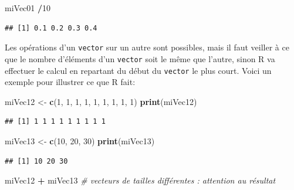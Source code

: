 \documentclass[
]{book}
\newenvironment{Shaded}{\begin{snugshade}}{\end{snugshade}}
\newcommand{\CommentTok}[1]{\textcolor[rgb]{0.56,0.35,0.01}{\textit{#1}}}
\newcommand{\DecValTok}[1]{\textcolor[rgb]{0.00,0.00,0.81}{#1}}
\newcommand{\KeywordTok}[1]{\textcolor[rgb]{0.13,0.29,0.53}{\textbf{#1}}}
\newcommand{\NormalTok}[1]{#1}
\newcommand{\OperatorTok}[1]{\textcolor[rgb]{0.81,0.36,0.00}{\textbf{#1}}}
\newcommand{\StringTok}[1]{\textcolor[rgb]{0.31,0.60,0.02}{#1}}
\begin{document}
\begin{Shaded}
\begin{Highlighting}[]
\NormalTok{miVec01 }\OperatorTok{/}\DecValTok{10}
\end{Highlighting}
\end{Shaded}

\begin{verbatim}
## [1] 0.1 0.2 0.3 0.4
\end{verbatim}

Les opérations d'un \texttt{vector} sur un autre sont possibles, mais il faut veiller à ce que le nombre d'éléments d'un \texttt{vector} soit le même que l'autre, sinon R va effectuer le calcul en repartant du début du \texttt{vector} le plus court. Voici un exemple pour illustrer ce que R fait:

\begin{Shaded}
\begin{Highlighting}[]
\NormalTok{miVec12 <-}\StringTok{ }\KeywordTok{c}\NormalTok{(}\DecValTok{1}\NormalTok{, }\DecValTok{1}\NormalTok{, }\DecValTok{1}\NormalTok{, }\DecValTok{1}\NormalTok{, }\DecValTok{1}\NormalTok{, }\DecValTok{1}\NormalTok{, }\DecValTok{1}\NormalTok{, }\DecValTok{1}\NormalTok{, }\DecValTok{1}\NormalTok{)}
\KeywordTok{print}\NormalTok{(miVec12)}
\end{Highlighting}
\end{Shaded}

\begin{verbatim}
## [1] 1 1 1 1 1 1 1 1 1
\end{verbatim}

\begin{Shaded}
\begin{Highlighting}[]
\NormalTok{miVec13 <-}\StringTok{ }\KeywordTok{c}\NormalTok{(}\DecValTok{10}\NormalTok{, }\DecValTok{20}\NormalTok{, }\DecValTok{30}\NormalTok{)}
\KeywordTok{print}\NormalTok{(miVec13)}
\end{Highlighting}
\end{Shaded}

\begin{verbatim}
## [1] 10 20 30
\end{verbatim}

\begin{Shaded}
\begin{Highlighting}[]
\NormalTok{miVec12 }\OperatorTok{+}\StringTok{ }\NormalTok{miVec13 }\CommentTok{# vecteurs de tailles différentes : attention au résultat}
\end{Highlighting}
\end{Shaded}
\end{document}
